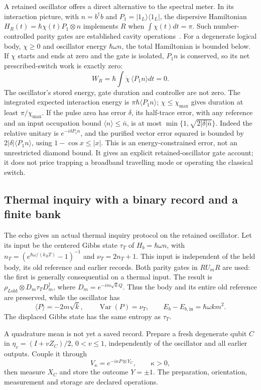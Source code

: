 \documentclass[aps,pre,onecolumn,superscriptaddress,floatfix,longbibliography]{revtex4-2}
\begin{document}
A retained oscillator offers a direct alternative to the spectral meter.
In its interaction picture, with $n=b^\dagger b$ and
$P_1=|1_L\rangle\langle1_L|$, the dispersive Hamiltonian
$H_R(t)=\hbar\chi(t)P_1\otimes n$ implements $R$ when
$\int\chi(t)dt=\pi$. Such number-controlled parity gates are established
cavity operations~\cite[pp.~2--3]{Sun2013}. For a degenerate logical body,
$\chi\ge0$ and oscillator energy $\hbar\omega n$, the total Hamiltonian
is bounded below. If $\chi$ starts and ends at zero and the gate is isolated,
$P_1n$ is conserved, so its net prescribed-switch work is exactly zero:
\[
 W_R=\hbar\int\dot\chi\,\langle P_1n\rangle dt=0.
\]
The oscillator's stored energy, gate duration and controller are not zero.
The integrated expected interaction energy is
$\pi\hbar\langle P_1n\rangle$; $\chi\le\chi_{\max}$ gives duration
at least $\pi/\chi_{\max}$. If the pulse area has error $\delta$, its
half-trace error, with any reference and an input occupation bound
$\langle n\rangle\le\bar n$, is at most
$\min\{1,\sqrt{2|\delta|\bar n}\}$. Indeed the relative unitary is
$e^{-i\delta P_1n}$, and the purified vector error squared is bounded by
$2|\delta|\langle P_1n\rangle$, using $1-\cos x\le|x|$.
This is an energy-constrained error, not an unrestricted diamond bound.
It gives an explicit retained-oscillator gate account; it does not price
trapping a broadband travelling mode or operating the classical switch.

\subsection{Thermal inquiry with a binary record and a finite bank}
\label{sec:thermal-bank}

The echo gives an actual thermal inquiry protocol on the retained oscillator.
Let its input be the centered Gibbs state $\tau_T$ of
$H_b=\hbar\omega n$, with $n_T=(e^{\hbar\omega/(k_BT)}-1)^{-1}$ and
$\nu_T=2n_T+1$. This input is independent of the held body, its old reference
and earlier records. Both parity gates in $R U_m R$ are used: the first is
generally consequential on a thermal input. The result is
$\rho_{L\mathrm{old}}\otimes D_m\tau_TD_m^\dagger$, where
$D_m=e^{-im\sqrt{k}Q}$. Thus the body and its entire old reference are
preserved, while the oscillator has
\[
 \langle P\rangle=-2m\sqrt{k},\qquad
 \operatorname{Var}(P)=\nu_T,\qquad
 E_b-E_{b,\mathrm{in}}=\hbar\omega km^2.
\]
The displaced Gibbs state has the same entropy as $\tau_T$.

A quadrature mean is not yet a saved record. Prepare a fresh degenerate
qubit $C$ in $\eta_v=(I+vZ_C)/2$, $0<v\le1$, independently of the
oscillator and all earlier outputs. Couple it through
\[
 V_\kappa=e^{-i\kappa P\otimes Y_C},\qquad \kappa>0,
\]
then measure $X_C$ and store the outcome $Y=\pm1$. The preparation,
orientation, measurement and storage are declared operations.
\end{document}
